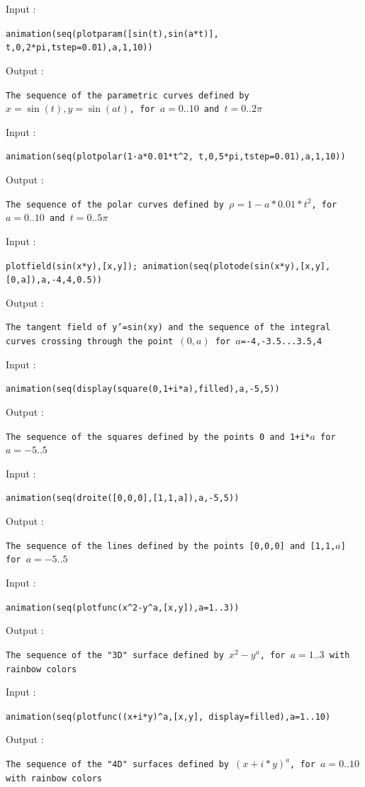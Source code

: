 \documentclass[a4paper,11pt]{book}
\begin{document}
Input :
\begin{center}{\tt animation(seq(plotparam([sin(t),sin(a*t)], t,0,2*pi,tstep=0.01),a,1,10))}\end{center}
Output :
\begin{center}{\tt The sequence of the parametric curves defined by $x=\sin(t),y=\sin(at)$, for $a=0..10$ and $t=0..2\pi$}\end{center}
Input :
\begin{center}{\tt animation(seq(plotpolar(1-a*0.01*t\verb|^|2, t,0,5*pi,tstep=0.01),a,1,10))}\end{center}
Output :
\begin{center}{\tt The sequence of the polar curves defined by $\rho=1-a*0.01*t^2$, for $a=0..10$ and $t=0..5\pi$}\end{center}
Input :
\begin{center}{\tt plotfield(sin(x*y),[x,y]); animation(seq(plotode(sin(x*y),[x,y],[0,a]),a,-4,4,0.5))}\end{center}
Output :
\begin{center}{\tt The tangent field of y'=sin(xy) and the sequence of the integral curves crossing through the point $(0,a)$ for $a$=-4,-3.5...3.5,4}\end{center}
Input :
\begin{center}{\tt animation(seq(display(square(0,1+i*a),filled),a,-5,5))}\end{center}
Output :
\begin{center}{\tt The sequence of the squares defined by the points 0 and 1+i*$a$ for $a=-5..5$}\end{center}
Input :
\begin{center}{\tt animation(seq(droite([0,0,0],[1,1,a]),a,-5,5))}\end{center}
Output :
\begin{center}{\tt The sequence of the lines defined by the points [0,0,0] and [1,1,$a$] for $a=-5..5$}\end{center}
Input :
\begin{center}{\tt animation(seq(plotfunc(x\verb|^|2-y\verb|^|a,[x,y]),a=1..3))}\end{center}
Output :
\begin{center}{\tt The sequence of the "3D" surface defined by $x^2-y^a$, for $a=1..3$ with rainbow colors}\end{center}
Input :
\begin{center}{\tt animation(seq(plotfunc((x+i*y)\verb|^|a,[x,y], display=filled),a=1..10)}\end{center}
Output :
\begin{center}{\tt The sequence of the "4D" surfaces defined by $(x+i*y)^a$, for $a=0..10$ with rainbow colors}\end{center}
\end{document}
